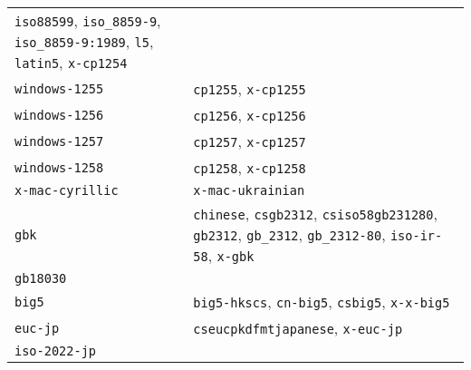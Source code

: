 \begin{longtable}[]{@{}
  >{\raggedright\arraybackslash}p{}
  >{\raggedright\arraybackslash}p{}@{}}
\texttt{\textquotesingle{}iso88599\textquotesingle{}},
\texttt{\textquotesingle{}iso\_8859-9\textquotesingle{}},
\texttt{\textquotesingle{}iso\_8859-9:1989\textquotesingle{}},
\texttt{\textquotesingle{}l5\textquotesingle{}},
\texttt{\textquotesingle{}latin5\textquotesingle{}},
\texttt{\textquotesingle{}x-cp1254\textquotesingle{}} \\
\texttt{\textquotesingle{}windows-1255\textquotesingle{}} &
\texttt{\textquotesingle{}cp1255\textquotesingle{}},
\texttt{\textquotesingle{}x-cp1255\textquotesingle{}} \\
\texttt{\textquotesingle{}windows-1256\textquotesingle{}} &
\texttt{\textquotesingle{}cp1256\textquotesingle{}},
\texttt{\textquotesingle{}x-cp1256\textquotesingle{}} \\
\texttt{\textquotesingle{}windows-1257\textquotesingle{}} &
\texttt{\textquotesingle{}cp1257\textquotesingle{}},
\texttt{\textquotesingle{}x-cp1257\textquotesingle{}} \\
\texttt{\textquotesingle{}windows-1258\textquotesingle{}} &
\texttt{\textquotesingle{}cp1258\textquotesingle{}},
\texttt{\textquotesingle{}x-cp1258\textquotesingle{}} \\
\texttt{\textquotesingle{}x-mac-cyrillic\textquotesingle{}} &
\texttt{\textquotesingle{}x-mac-ukrainian\textquotesingle{}} \\
\texttt{\textquotesingle{}gbk\textquotesingle{}} &
\texttt{\textquotesingle{}chinese\textquotesingle{}},
\texttt{\textquotesingle{}csgb2312\textquotesingle{}},
\texttt{\textquotesingle{}csiso58gb231280\textquotesingle{}},
\texttt{\textquotesingle{}gb2312\textquotesingle{}},
\texttt{\textquotesingle{}gb\_2312\textquotesingle{}},
\texttt{\textquotesingle{}gb\_2312-80\textquotesingle{}},
\texttt{\textquotesingle{}iso-ir-58\textquotesingle{}},
\texttt{\textquotesingle{}x-gbk\textquotesingle{}} \\
\texttt{\textquotesingle{}gb18030\textquotesingle{}} & \\
\texttt{\textquotesingle{}big5\textquotesingle{}} &
\texttt{\textquotesingle{}big5-hkscs\textquotesingle{}},
\texttt{\textquotesingle{}cn-big5\textquotesingle{}},
\texttt{\textquotesingle{}csbig5\textquotesingle{}},
\texttt{\textquotesingle{}x-x-big5\textquotesingle{}} \\
\texttt{\textquotesingle{}euc-jp\textquotesingle{}} &
\texttt{\textquotesingle{}cseucpkdfmtjapanese\textquotesingle{}},
\texttt{\textquotesingle{}x-euc-jp\textquotesingle{}} \\
\texttt{\textquotesingle{}iso-2022-jp\textquotesingle{}} &

\end{longtable}
